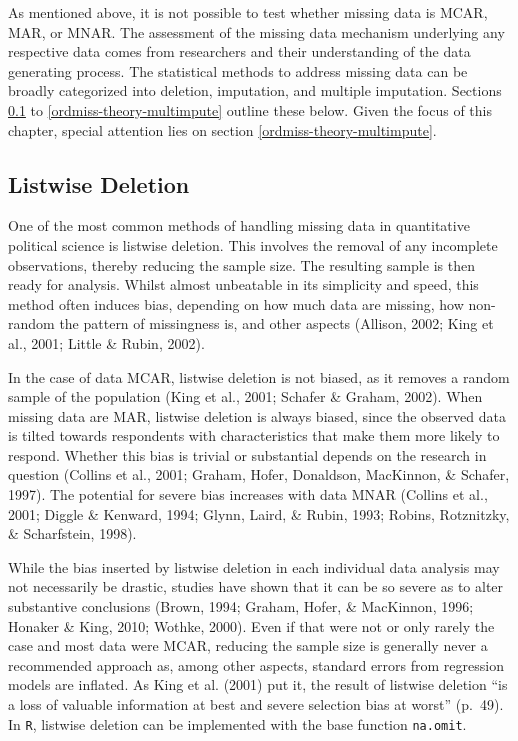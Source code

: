 \documentclass[12pt,econ]{sources/authesis}
\begin{document}
As mentioned above, it is not possible to test whether missing data is MCAR, MAR, or MNAR. The assessment of the missing data mechanism underlying any respective data comes from researchers and their understanding of the data generating process. The statistical methods to address missing data can be broadly categorized into deletion, imputation, and multiple imputation. Sections \ref{ordmiss-theory-delete} to \ref{ordmiss-theory-multimpute} outline these below. Given the focus of this chapter, special attention lies on section \ref{ordmiss-theory-multimpute}.

\hypertarget{ordmiss-theory-delete}{%
\subsection{Listwise Deletion}\label{ordmiss-theory-delete}}

One of the most common methods of handling missing data in quantitative political science is listwise deletion. This involves the removal of any incomplete observations, thereby reducing the sample size. The resulting sample is then ready for analysis. Whilst almost unbeatable in its simplicity and speed, this method often induces bias, depending on how much data are missing, how non-random the pattern of missingness is, and other aspects (Allison, 2002; King et al., 2001; Little \& Rubin, 2002).

In the case of data MCAR, listwise deletion is not biased, as it removes a random sample of the population (King et al., 2001; Schafer \& Graham, 2002). When missing data are MAR, listwise deletion is always biased, since the observed data is tilted towards respondents with characteristics that make them more likely to respond. Whether this bias is trivial or substantial depends on the research in question (Collins et al., 2001; Graham, Hofer, Donaldson, MacKinnon, \& Schafer, 1997). The potential for severe bias increases with data MNAR (Collins et al., 2001; Diggle \& Kenward, 1994; Glynn, Laird, \& Rubin, 1993; Robins, Rotznitzky, \& Scharfstein, 1998).

While the bias inserted by listwise deletion in each individual data analysis may not necessarily be drastic, studies have shown that it can be so severe as to alter substantive conclusions (Brown, 1994; Graham, Hofer, \& MacKinnon, 1996; Honaker \& King, 2010; Wothke, 2000). Even if that were not or only rarely the case and most data were MCAR, reducing the sample size is generally never a recommended approach as, among other aspects, standard errors from regression models are inflated. As King et al. (2001) put it, the result of listwise deletion ``is a loss of valuable information at best and severe selection bias at worst'' (p.~49). In \texttt{R}, listwise deletion can be implemented with the base function \texttt{na.omit}.
\end{document}
